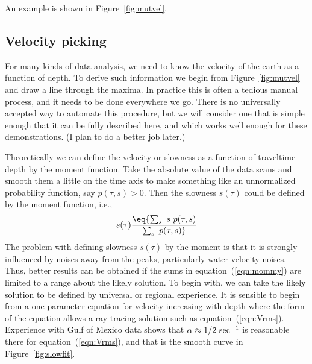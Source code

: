 
\par
An example %
is shown in Figure~\ref{fig:mutvel}.


\subsection{Velocity picking}
For many kinds of data analysis,
we need to know the velocity of the earth as a function of depth.
To derive such information
we begin from Figure~\ref{fig:mutvel}
and draw a line through the maxima.
In practice this is often a tedious manual process,
and it needs to be done everywhere we go.
There is no universally accepted way to automate
this procedure, but we will consider one
that is simple enough that it can be fully described here,
and which works well enough for these demonstrations.
(I plan to do a better job later.)

\par
Theoretically we can define the velocity or slowness
as a function of traveltime depth by the moment function.
Take the absolute value of the data scans and smooth
them a little on the time axis to make something like an unnormalized
probability function, say $p(\tau ,s)>0$.
Then the slowness $s(\tau )$ could be defined by the moment function, i.e.,
\begin{equation}
s(\tau ) \eq { \sum_s \ s\  p(\tau ,s) \over \sum_s \ p(\tau ,s) }
\label{eqn:mommy}
\end{equation}
The problem with defining slowness $s(\tau )$ by the moment is that it is 
strongly influenced by noises away from the peaks,
particularly water velocity noises.
Thus, better results can be obtained if the sums in equation~(\ref{eqn:mommy})
are limited to a range about the likely solution.
To begin with, we can take the likely solution to be defined
by universal or regional experience.
It is sensible to begin from a one-parameter equation
for velocity increasing with depth where the form of the equation
allows a ray tracing solution
such as equation~(\ref{eqn:Vrms}).
Experience with Gulf of Mexico data shows that
$\alpha\approx 1/2\  {\rm sec}^{-1}$ is reasonable there
for equation~(\ref{eqn:Vrms}),
and that is the smooth curve
in Figure~\ref{fig:slowfit}.


